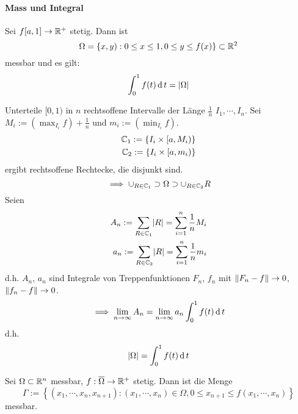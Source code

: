 \paragraph{Mass und Integral}
\begin{Lem}
  Sei $f[a,1]\rightarrow\mathbb{R}^+$ stetig. Dann ist
  \[\Omega=\left\{ x,y):0\leq x\leq 1, 0\leq y \leq f(x)\right\}\subset\mathbb{R}^2\]
  messbar und es gilt:
  \[\int_0^1f(t)\operatorname{d} t=\mathopen| \Omega \mathclose|\]
\end{Lem}
\begin{Bew}
  Unterteile $[0,1)$ in $n$ rechtsoffene Intervalle der Länge $\frac{1}{n}$ $I_1,\cdots,I_n$. Sei $M_i:=(\max_{I_i}f)+\frac{1}{n}$ und $m_i:=(\min_{I_i}f)$.
  \begin{eqnarray*}
    \mathbb{C}_1:=\left\{ I_i\times [a,M_i) \right\}\\
    \mathbb{C}_2:=\left\{ I_i\times [a,m_i) \right\}
  \end{eqnarray*}
  ergibt rechtsoffene Rechtecke, die disjunkt sind.
  \[\implies \cup_{R\in\mathbb{C}_1}\supset\Omega\supset\cup_{R\in\mathbb{C}_2}R\]
  Seien
  \begin{eqnarray*}
    A_n:=\sum_{R\in\mathbb{C}_1}\mathopen| R \mathclose|=\sum^n_{i=1}\frac{1}{n}M_i\\
    a_n:=\sum_{R\in\mathbb{C}_2}\mathopen| R \mathclose|=\sum^n_{i=1}\frac{1}{n}m_i
  \end{eqnarray*}
  d.h. $A_n$, $a_n$ sind Integrale von Treppenfunktionen $F_n$, $f_n$ mit $\left\| F_n-f \right\|\rightarrow 0$, $\left\| f_n-f \right\|\rightarrow 0$.
  \[\implies \displaystyle\lim_{n\rightarrow\infty} A_n=\displaystyle\lim_{n\rightarrow\infty}a_n\int_0^1f(t)\operatorname{d} t\]
  d.h.
  \[\mathopen| \Omega \mathclose|=\int_0^1f(t)\operatorname{d} t\]
\end{Bew}
\begin{Sat}
  Sei $\Omega\subset\mathbb{R}^n$ messbar, $f:\overline{\Omega}\rightarrow\mathbb{R}^+$ stetig. Dann ist die Menge
  \[\Gamma:=\left\{ (x_1,\cdots,x_n,x_{n+1}):(x_1,\cdots,x_n)\in\Omega, 0\leq x_{n+1}\leq f(x_1,\cdots,x_n) \right\}\]
  messbar.
\end{Sat}
